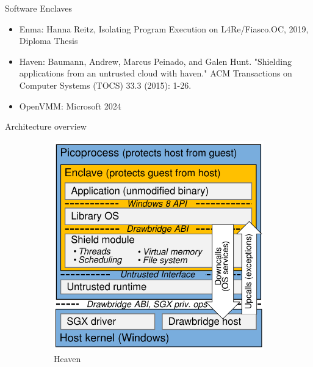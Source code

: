 \documentclass[aspectratio=169]{beamer}
\begin{document}
\begin{frame}{Software Enclaves}
    \begin{itemize}
        \item Enma: Hanna Reitz, Isolating Program Execution on L4Re/Fiasco.OC, 2019, Diploma Thesis
        \item Haven: Baumann, Andrew, Marcus Peinado, and Galen Hunt. "Shielding applications from an untrusted cloud with haven." {\footnotesize{ACM Transactions on Computer Systems (TOCS) 33.3 (2015): 1-26.}}
        \item OpenVMM: Microsoft 2024
    \end{itemize}
\end{frame}
\begin{frame}{Architecture overview}
    \begin{figure}
        \begin{subfigure}[]{0.3\textwidth}
            \includegraphics[width=\textwidth]{images/haven.png}
            \caption{Heaven}
        \end{subfigure}
        \begin{subfigure}[]{0.3\textwidth}

\end{subfigure}
\end{figure}
\end{frame}
\end{document}
